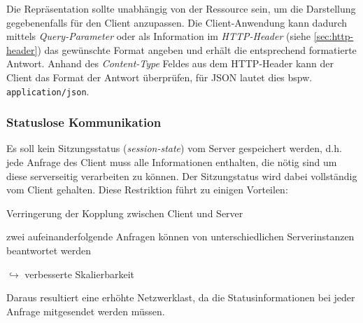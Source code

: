 Die Repräsentation sollte unabhängig von der Ressource sein, um die Darstellung gegebenenfalls für den Client anzupassen. 
Die Client-Anwendung kann dadurch mittels \emph{Query-Parameter} oder als Information im \emph{HTTP-Header} (siehe \cref{sec:http-header}) das gewünschte Format angeben und erhält die entsprechend formatierte Antwort.
Anhand des \emph{Content-Type} Feldes aus dem HTTP-Header kann der Client das Format der Antwort überprüfen, für \gls{JSON} lautet dies bspw. \texttt{application/json}.

\subsubsection{Statuslose Kommunikation}
\label{sec:stateless_communication}

Es soll kein Sitzungsstatus (\emph{session-state}) vom Server gespeichert werden, d.h. jede Anfrage des Client muss alle Informationen enthalten, die nötig sind um diese serverseitig verarbeiten zu können. Der Sitzungstatus wird dabei vollständig vom Client gehalten. 
Diese Restriktion führt zu einigen Vorteilen:
\begin{compactitem}
    \item Verringerung der Kopplung zwischen Client und Server
    \item zwei aufeinanderfolgende Anfragen können von unterschiedlichen Serverinstanzen beantwortet werden
    \item[$\hookrightarrow$] verbesserte Skalierbarkeit
\end{compactitem}

Daraus resultiert eine erhöhte Netzwerklast, da die Statusinformationen bei jeder Anfrage mitgesendet werden müssen.
